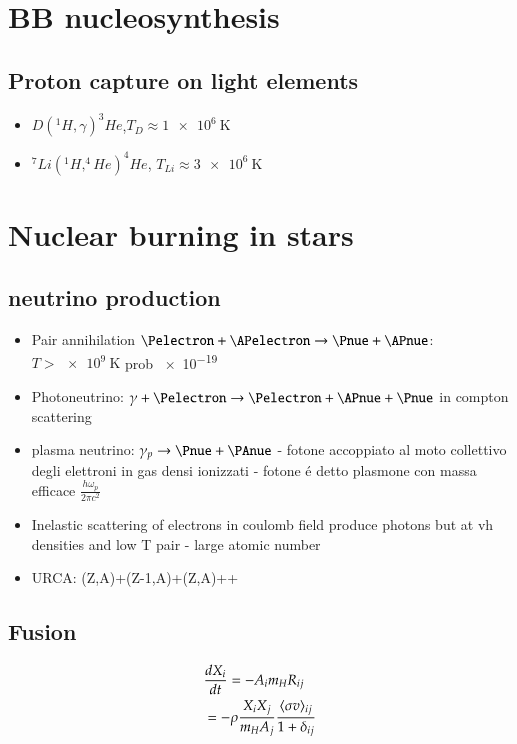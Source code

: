 \chapter{BB nucleosynthesis}
\PartialToc

\section{Proton capture on light elements}

\begin{itemize}
\item $D(^1H,\gamma)^3He$,$T_D\approx \SI{1e6}{\kelvin}$
\item $^7Li(^1H,^4He)^4He$, $T_{Li}\approx\SI{3e6}{\kelvin}$ 

\end{itemize}

\chapter{Nuclear burning in stars}
\PartialToc

\section{neutrino production}
\begin{itemize}
\item  Pair annihilation $\Pelectron+\APelectron\to\Pnue+\APnue$: $T>\SI{e9}{\kelvin}$ prob \num{e-19}
\item Photoneutrino: $\gamma+\Pelectron\to\Pelectron+\APnue+\Pnue$ in compton scattering
\item plasma neutrino: $\gamma_p\to\Pnue+\PAnue$ - fotone accoppiato al moto collettivo degli elettroni in gas densi ionizzati - fotone \'e detto plasmone con massa efficace $\frac{h\omega_p}{2\pi c^2}$
\item Inelastic scattering of electrons in coulomb field produce photons but at vh densities and low T \Pnue\APnue pair - large atomic number
\item URCA: (Z,A)+\Pelectron\to(Z-1,A)+\Pnue\to(Z,A)+\Pelectron+\APelectron
\end{itemize}
\section{Fusion}
\begin{align*}
&\TDy{t}{X_i}=-A_im_HR_{ij}\\
&=-\rho\frac{X_iX_j}{m_HA_j}\frac{\exv{\sigma v}_{ij}}{1+\delta_{ij}}
\end{align*} 

